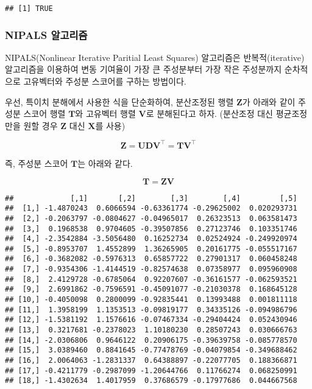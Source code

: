 \documentclass[]{book}
\newenvironment{Shaded}{\begin{snugshade}}{\end{snugshade}}
\newcommand{\NormalTok}[1]{#1}
\newcommand{\OperatorTok}[1]{\textcolor[rgb]{0.81,0.36,0.00}{\textbf{#1}}}
\newcommand{\StringTok}[1]{\textcolor[rgb]{0.31,0.60,0.02}{#1}}
\begin{document}
\begin{verbatim}
## [1] TRUE
\end{verbatim}

\hypertarget{pca-nipals}{%
\subsubsection{NIPALS 알고리즘}\label{pca-nipals}}

NIPALS(Nonlinear Iterative Paritial Least Squares) 알고리즘은 반복적(iterative) 알고리즘을 이용하여 변동 기여율이 가장 큰 주성분부터 가장 작은 주성분까지 순차적으로 고유벡터와 주성분 스코어를 구하는 방법이다.

우선, 특이치 분해에서 사용한 식을 단순화하여, 분산조정된 행렬 \(\mathbf{Z}\)가 아래와 같이 주성분 스코어 행렬 \(\mathbf{T}\)와 고유벡터 행렬 \(\mathbf{V}\)로 분해된다고 하자. (분산조정 대신 평균조정만을 원할 경우 \(\mathbf{Z}\) 대신 \(\mathbf{X}\)를 사용)

\[ \mathbf{Z} = \mathbf{U} \mathbf{D} \mathbf{V}^\top = \mathbf{T} \mathbf{V}^\top \]

즉, 주성분 스코어 \(\mathbf{T}\)는 아래와 같다.

\[ \mathbf{T} = \mathbf{Z} \mathbf{V} \]

\begin{Shaded}
\end{Shaded}

\begin{verbatim}
##             [,1]       [,2]        [,3]        [,4]         [,5]
##  [1,] -1.4870243  0.6066594 -0.63361774 -0.29625002  0.020293731
##  [2,] -0.2063797 -0.0804627 -0.04965017  0.26323513  0.063581473
##  [3,]  0.1968538  0.9704605 -0.39507856  0.27123746  0.103351746
##  [4,] -2.3542884 -3.5056480  0.16252734  0.02524924 -0.249920974
##  [5,] -0.8953707  1.4552899  1.36265905  0.20161775 -0.055517167
##  [6,] -0.3682082 -0.5976313  0.65857722  0.27901317  0.060458248
##  [7,] -0.9354306 -1.4144519 -0.82574638  0.07358977  0.095960908
##  [8,]  2.4129728 -0.6785064  0.92207607 -0.36161577 -0.062593521
##  [9,]  2.6991862 -0.7596591 -0.45091077 -0.21030378  0.168645128
## [10,] -0.4050098  0.2800099 -0.92835441  0.13993488  0.001811118
## [11,]  1.3958199  1.1353513 -0.09819177  0.34335126 -0.094986796
## [12,] -1.5381192  1.1576616 -0.07467334 -0.29404424  0.052430946
## [13,]  0.3217681 -0.2378023  1.10180230  0.28507243  0.030666763
## [14,] -2.0306806  0.9646122  0.20906175 -0.39639758 -0.085778570
## [15,]  3.0389460  0.8841645 -0.77478769 -0.04079854 -0.349688462
## [16,]  2.0064063 -1.2831337  0.64388897 -0.22077705  0.188366871
## [17,] -0.4211779 -0.2987099 -1.20644766  0.11766274  0.068250991
## [18,] -1.4302634  1.4017959  0.37686579 -0.17977686  0.044667568
\end{verbatim}
\end{document}
